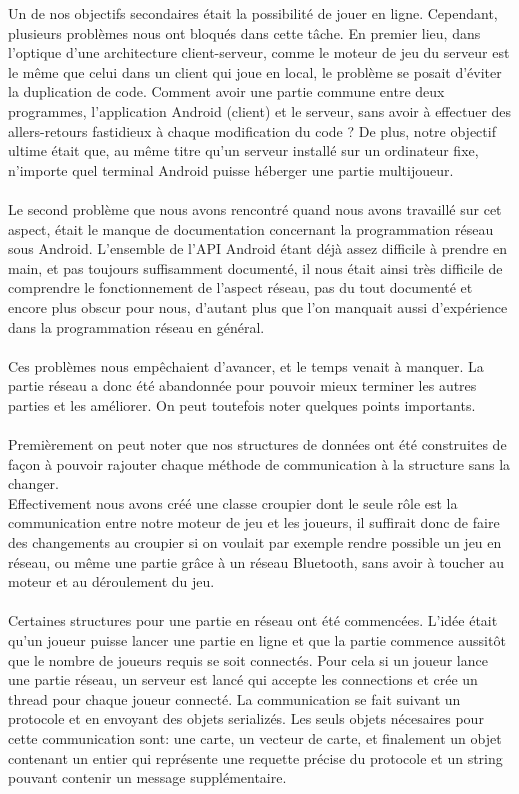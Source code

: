 \documentclass[a4paper]{report}
\begin{document}
		Un de nos objectifs secondaires était la possibilité de jouer en ligne. Cependant, plusieurs problèmes nous ont bloqués dans cette tâche.
		En premier lieu, dans l’optique d’une architecture client-serveur, comme le moteur de jeu du serveur est le même que celui dans un client qui joue en local, le problème se posait 			d’éviter la duplication de code. Comment avoir une partie commune entre deux programmes, l’application Android (client) et le serveur, sans avoir à effectuer des allers-retours 			fastidieux à chaque modification du code ? De plus, notre objectif ultime était que, au même titre qu’un serveur installé sur un ordinateur fixe, n’importe quel terminal Android puisse 			héberger une partie multijoueur. \\
		\\ 
		Le second problème que nous avons rencontré quand nous avons travaillé sur cet aspect, était le manque de documentation concernant la programmation réseau sous Android. L’ensemble de 			l’API Android étant déjà assez difficile à prendre en main, et pas toujours suffisamment documenté, il nous était ainsi très difficile de comprendre le fonctionnement de l’aspect 			réseau, pas du tout documenté et encore plus obscur pour nous, d’autant plus que l’on manquait aussi d’expérience dans la programmation réseau en général.\\
		\\ 
		Ces problèmes nous empêchaient d’avancer, et le temps venait à manquer. La partie réseau a donc été abandonnée pour pouvoir mieux terminer les autres parties et les améliorer. On peut toutefois 			noter quelques points importants.\\
		\\ 
		Premièrement on peut noter que nos structures de données ont été construites de façon à pouvoir rajouter chaque méthode de communication à la structure sans la changer.\\
		Effectivement nous avons créé une classe croupier dont le seule rôle est la communication entre notre moteur de jeu et les joueurs, il suffirait donc de faire des changements au croupier 			si on voulait par exemple rendre possible un jeu en réseau, ou même une partie grâce à un réseau Bluetooth, sans avoir à toucher au moteur et au déroulement du jeu.\\
		\\ 
		Certaines structures pour une partie en réseau ont été commencées. L'idée était qu'un joueur puisse lancer une partie en ligne et que la partie commence aussitôt que le nombre de joueurs 		requis se soit connectés. Pour cela si un joueur lance une partie réseau, un serveur est lancé qui accepte les connections et crée un thread pour chaque joueur connecté. La 			communication se fait suivant un protocole et en envoyant des objets serializés. Les seuls objets nécesaires pour cette communication sont: une carte, un vecteur de carte, et 		finalement un objet contenant un entier qui représente une requette précise du protocole et un string pouvant contenir un message supplémentaire.\\
\end{document}
